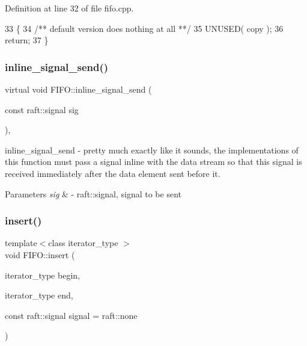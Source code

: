 Definition at line 32 of file fifo.\+cpp.


\begin{DoxyCode}
33 \{\textcolor{comment}{}
34 \textcolor{comment}{   /** default version does nothing at all **/}
35    UNUSED( copy );
36    \textcolor{keywordflow}{return};
37 \}
\end{DoxyCode}
\hypertarget{class_f_i_f_o_ae7e91c74078cd52cdfc6f3609b83c8eb}{}\label{class_f_i_f_o_ae7e91c74078cd52cdfc6f3609b83c8eb} 
\subsubsection{\texorpdfstring{inline\+\_\+signal\+\_\+send()}{inline\_signal\_send()}}
{\footnotesize\ttfamily virtual void F\+I\+F\+O\+::inline\+\_\+signal\+\_\+send (\begin{DoxyParamCaption}\item[{const raft\+::signal}]{sig }\end{DoxyParamCaption})\hspace{0.3cm}{\ttfamily [protected]}, {}}

inline\+\_\+signal\+\_\+send -\/ pretty much exactly like it sounds, the implementations of this function must pass a signal inline with the data stream so that this signal is received immediately after the data element sent before it. 
\begin{DoxyParams}{Parameters}
{\em sig} & -\/ raft\+::signal, signal to be sent \\
\hline
\end{DoxyParams}
\hypertarget{class_f_i_f_o_a922b94b854cc9e3ee37fbd447982f663}{}\label{class_f_i_f_o_a922b94b854cc9e3ee37fbd447982f663} 
\subsubsection{\texorpdfstring{insert()}{insert()}}
{\footnotesize\ttfamily template$<$class iterator\+\_\+type $>$ \\
void F\+I\+F\+O\+::insert (\begin{DoxyParamCaption}\item[{iterator\+\_\+type}]{begin,  }\item[{iterator\+\_\+type}]{end,  }\item[{const raft\+::signal}]{signal = {\ttfamily raft\+:\+:none} }\end{DoxyParamCaption})\hspace{0.3cm}{\ttfamily [inline]}}

